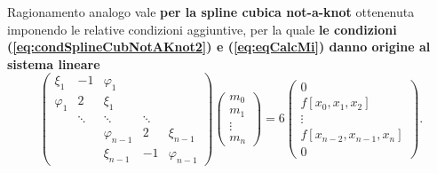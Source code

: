 Ragionamento analogo vale \textbf{per la spline cubica not-a-knot} ottenenuta imponendo le relative condizioni aggiuntive, per la quale \textbf{le condizioni (\ref{eq:condSplineCubNotAKnot2}) e (\ref{eq:eqCalcMi}) danno origine al sistema lineare}
\begin{equation}\label{eq:sisTridSpline}
    \begin{pmatrix}
        \xi_1 & -1 & \varphi_1 && \\
        \varphi_1 & 2 & \xi_1&&\\
        &\ddots & \ddots &\ddots&\\
        &&\varphi_{n-1}& 2 &\xi_{n-1}\\
        && \xi_{n-1} & -1 & \varphi_{n-1}
    \end{pmatrix}\begin{pmatrix}
        m_0\\
        m_1\\
        \vdots\\
        m_{n}
    \end{pmatrix}=6\begin{pmatrix}
        0\\
        f[x_0,x_1,x_2]\\
        \vdots\\
        f[x_{n-2},x_{n-1},x_n]\\
        0
    \end{pmatrix}.
\end{equation}

